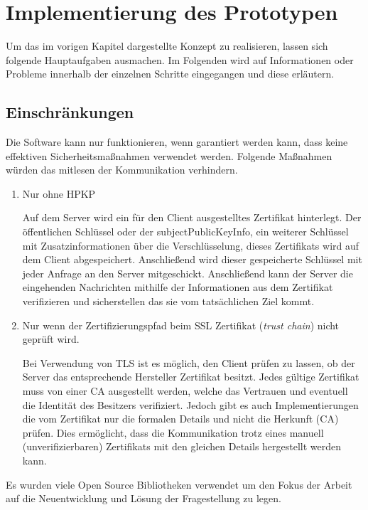 \chapter{Implementierung des Prototypen}

Um das im vorigen Kapitel dargestellte Konzept zu realisieren, lassen sich folgende Hauptaufgaben ausmachen. Im Folgenden wird auf Informationen oder Probleme innerhalb der einzelnen Schritte eingegangen und diese erläutern.

\section{Einschränkungen}
Die Software kann nur funktionieren, wenn garantiert werden kann, dass keine effektiven Sicherheitsmaßnahmen verwendet werden. Folgende Maßnahmen würden das mitlesen der Kommunikation verhindern.
\begin{enumerate}
    \item Nur ohne \ac{HPKP} %
    
    Auf dem Server wird ein für den Client ausgestelltes Zertifikat hinterlegt. Der öffentlichen Schlüssel oder der \glqq subjectPublicKeyInfo\grqq{}, ein weiterer Schlüssel mit Zusatzinformationen über die Verschlüsselung, dieses Zertifikats wird auf dem Client abgespeichert. Anschließend wird dieser gespeicherte Schlüssel mit jeder Anfrage an den Server mitgeschickt. Anschließend kann der Server die eingehenden Nachrichten mithilfe der Informationen aus dem Zertifikat verifizieren und sicherstellen das sie vom tatsächlichen Ziel kommt.
    \item Nur wenn der Zertifizierungspfad beim SSL Zertifikat (\emph{trust chain}) nicht geprüft wird.
    
    Bei Verwendung von TLS ist es möglich, den Client prüfen zu lassen, ob der Server das entsprechende Hersteller Zertifikat besitzt. Jedes gültige Zertifikat muss von einer \ac{CA} ausgestellt werden, welche das Vertrauen und eventuell die Identität des Besitzers verifiziert. Jedoch gibt es auch Implementierungen die vom Zertifikat nur die formalen Details und nicht die Herkunft (CA) prüfen.
    Dies ermöglicht, dass die Kommunikation trotz eines manuell (unverifizierbaren) Zertifikats mit den gleichen Details hergestellt werden kann.
\end{enumerate}

Es wurden viele Open Source Bibliotheken verwendet um den Fokus der Arbeit auf die Neuentwicklung und Lösung der Fragestellung zu legen.

